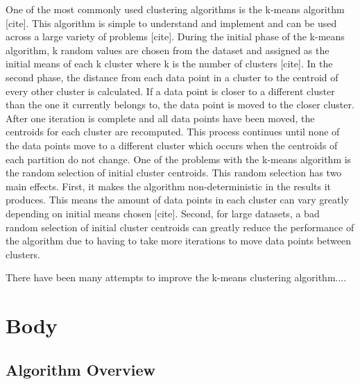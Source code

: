 \documentclass[conference]{IEEEtran}
\begin{document}
One of the most commonly used clustering algorithms is the k-means algorithm [cite]. This algorithm is simple to understand and implement and can be used across a large variety of problems [cite]. During the initial phase of the k-means algorithm, k random values are chosen from the dataset and assigned as the initial means of each k cluster where k is the number of clusters [cite]. In the second phase, the distance from each data point in a cluster to the centroid of every other cluster is calculated. If a data point is closer to a different cluster than the one it currently belongs to, the data point is moved to the closer cluster. After one iteration is complete and all data points have been moved, the centroids for each cluster are recomputed. This process continues until none of the data points move to a different cluster which occurs when the centroids of each partition do not change. One of the problems with the k-means algorithm is the random selection of initial cluster centroids. This random selection has two main effects. First, it makes the algorithm non-deterministic in the results it produces. This means the amount of data points in each cluster can vary greatly depending on initial means chosen [cite]. Second, for large datasets, a bad random selection of initial cluster centroids can greatly reduce the performance of the algorithm due to having to take more iterations to move data points between clusters.

There have been many attempts to improve the k-means clustering algorithm....



\section{Body}

\subsection{Algorithm Overview}
\noindent{}
\vspace{15px}
\end{document}
